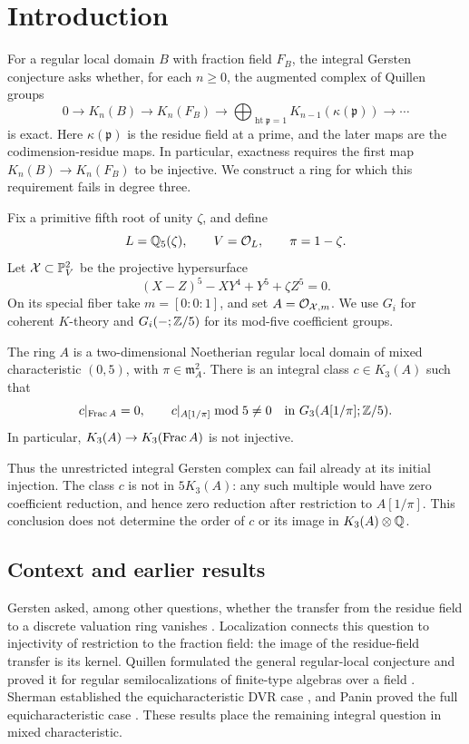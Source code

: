 \section{Introduction}\label{sec:introduction}

For a regular local domain $B$ with fraction field $F_B$, the integral
Gersten conjecture asks whether, for each $n\geq0$, the augmented
complex of Quillen groups
\[
 0\longrightarrow K_n(B)\longrightarrow K_n(F_B)
 \longrightarrow
 \bigoplus_{\operatorname{ht}\mathfrak p=1}
 K_{n-1}(\kappa(\mathfrak p))\longrightarrow\cdots
\]
is exact. Here $\kappa(\mathfrak p)$ is the residue field at a prime,
and the later maps are the codimension-residue maps. In particular,
exactness requires the first map $K_n(B)\to K_n(F_B)$ to be injective.
We construct a ring for which this requirement fails in degree three.

Fix a primitive fifth root of unity $\zeta$, and define
\[
 L=\mathbb Q_5(\zeta),\qquad V=\mathcal O_L,\qquad \pi=1-\zeta.
\]
Let $\mathcal X\subset\mathbb P^2_V$ be the projective hypersurface
\[
 (X-Z)^5-XY^4+Y^5+\zeta Z^5=0.
\]
On its special fiber take $m=[0:0:1]$, and set
$A=\mathcal O_{\mathcal X,m}$. We use $G_i$ for coherent $K$-theory and
$G_i(-;\mathbb Z/5)$ for its mod-five coefficient groups.

\begin{theorem}\label{thm:main}
The ring $A$ is a two-dimensional Noetherian regular local domain
of mixed characteristic $(0,5)$, with $\pi\in\mathfrak m_A^2$.
There is an integral class $c\in K_3(A)$ such that
\[
 c|_{\operatorname{Frac} A}=0,
 \qquad
 c|_{A[1/\pi]}\bmod5\ne0
 \quad\text{in }G_3(A[1/\pi];\mathbb Z/5).
\]
In particular, $K_3(A)\to K_3(\operatorname{Frac} A)$ is not injective.
\end{theorem}

Thus the unrestricted integral Gersten complex can fail already at
its initial injection. The class $c$ is not in $5K_3(A)$: any such
multiple would have zero coefficient reduction, and hence zero
reduction after restriction to $A[1/\pi]$. This conclusion does not
determine the order of $c$ or its image in $K_3(A)\otimes\mathbb Q$.

\subsection*{Context and earlier results}

Gersten asked, among other questions, whether the transfer from the
residue field to a discrete valuation ring vanishes
\cite[Problem 9]{GerstenProblems}. Localization connects this question
to injectivity of restriction to the fraction field: the image of
the residue-field transfer is its kernel. Quillen formulated the
general regular-local conjecture and proved it for regular
semilocalizations of finite-type algebras over a field
\cite[\S7, Conjecture 5.10 and Theorem 5.11]{QuillenHigher}.
Sherman established the equicharacteristic DVR case
\cite[p.~498]{Sherman}, and Panin proved the full equicharacteristic
case \cite[Theorem A]{Panin}. These results place the remaining
integral question in mixed characteristic.

